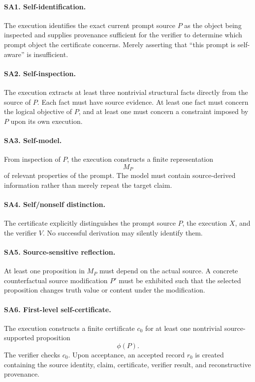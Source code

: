\documentclass[11pt]{article}
\theoremstyle{remark}
\begin{document}
\paragraph{SA1. Self-identification.}
The execution identifies the exact current prompt source $P$ as the object being inspected and supplies provenance sufficient for the verifier to determine which prompt object the certificate concerns. Merely asserting that ``this prompt is self-aware'' is insufficient.

\paragraph{SA2. Self-inspection.}
The execution extracts at least three nontrivial structural facts directly from the source of $P$. Each fact must have source evidence. At least one fact must concern the logical objective of $P$, and at least one must concern a constraint imposed by $P$ upon its own execution.

\paragraph{SA3. Self-model.}
From inspection of $P$, the execution constructs a finite representation
\[
M_P
\]
of relevant properties of the prompt. The model must contain source-derived information rather than merely repeat the target claim.

\paragraph{SA4. Self/nonself distinction.}
The certificate explicitly distinguishes the prompt source $P$, the execution $X$, and the verifier $V$. No successful derivation may silently identify them.

\paragraph{SA5. Source-sensitive reflection.}
At least one proposition in $M_P$ must depend on the actual source. A concrete counterfactual source modification $P'$ must be exhibited such that the selected proposition changes truth value or content under the modification.

\paragraph{SA6. First-level self-certificate.}
The execution constructs a finite certificate $c_0$ for at least one nontrivial source-supported proposition
\[
\phi(P).
\]
The verifier checks $c_0$. Upon acceptance, an accepted record $r_0$ is created containing the source identity, claim, certificate, verifier result, and reconstructive provenance.
\end{document}
